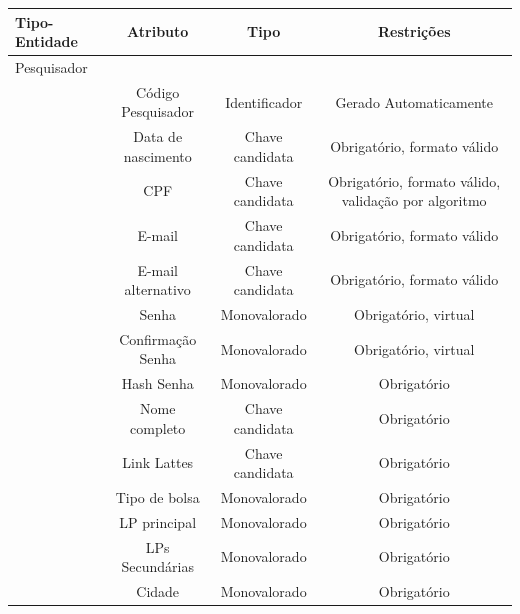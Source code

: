 \documentclass[11pt]{../../classes/ifscarticle}
\begin{document}
\begin{table}[h]
  \centering
  \vspace{0.5cm}
  \begin{tabular}{l|c|c|c|}
    Tipo-Entidade & Atributo & Tipo & Restrições \\ %
    \hline                               %
    Pesquisador \\
                  & Código Pesquisador  & Identificador   & Gerado Automaticamente                               \\
                  & Data de nascimento  & Chave candidata & Obrigatório, formato válido                          \\
                  & CPF                 & Chave candidata & Obrigatório, formato válido, validação por algoritmo \\
                  & E-mail              & Chave candidata & Obrigatório, formato válido                          \\
                  & E-mail alternativo  & Chave candidata & Obrigatório, formato válido                          \\
                  & Senha               & Monovalorado    & Obrigatório, virtual                                 \\
                  & Confirmação Senha   & Monovalorado    & Obrigatório, virtual                                 \\
                  & Hash Senha          & Monovalorado    & Obrigatório                                          \\
                  & Nome completo       & Chave candidata & Obrigatório                                          \\
                  & Link Lattes         & Chave candidata & Obrigatório                                          \\
                  & Tipo de bolsa       & Monovalorado    & Obrigatório                                          \\
                  & LP principal        & Monovalorado    & Obrigatório                                          \\
                  & LPs Secundárias     & Monovalorado    & Obrigatório                                          \\
                  & Cidade              & Monovalorado    & Obrigatório                                          \\

\end{tabular}
\end{table}
\end{document}
